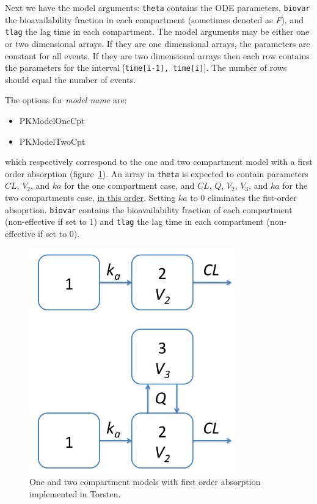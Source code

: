 \documentclass[11pt]{amsart}
\begin{document}
Next we have the model arguments: \texttt{theta} contains the ODE parameters, \texttt{biovar} the bioavailability fraction in each compartment (sometimes denoted as \textit{F}), and \texttt{tlag} the lag time in each compartment.  The model arguments may be either one or two dimensional arrays. If they are one dimensional arrays, the parameters are constant for all events. If they are two dimensional arrays then each row contains the parameters for the interval [\texttt{time[i-1], time[i]}]. The number of rows should equal the number of events. 

The options for \textit{model name} are:
\begin{itemize}
  \item PKModelOneCpt
  \item PKModelTwoCpt
\end{itemize}
which respectively correspond to the one and two compartment model with a first order absorption (figure~\ref{cptModels}). An array in \texttt{theta} is expected to contain parameters $CL$, $V_2$, and $ka$ for the one compartment case, and $CL$, $Q$, $V_2$, $V_3$, and $ka$ for the two compartments case, \underline{in this order}. Setting $ka$ to 0 eliminates the fist-order absoprtion. \texttt{biovar} contains the bioavailability fraction of each compartment (non-effective if set to 1) and \texttt{tlag} the lag time in each compartment (non-effective if set to 0).

\begin{figure}[htbp]
\includegraphics[width=3.5in,trim=0in 0in 0 0in]{graphics/cptModels.png}
\caption{One and two compartment models with first order absorption implemented in Torsten.}
\label{cptModels}
\end{figure}
\end{document}
